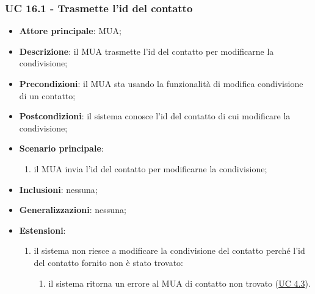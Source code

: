     \subsubsection{UC 16.1 - Trasmette l'id del contatto} \label{sec:UC16.1}
    \begin{itemize}
        \item \textbf{Attore principale}: MUA;
        \item \textbf{Descrizione}: il MUA trasmette l'id del contatto per modificarne la condivisione;
        \item \textbf{Precondizioni}: il MUA sta usando la funzionalità di modifica condivisione di un contatto;
        \item \textbf{Postcondizioni}: il sistema conosce l'id del contatto di cui modificare la condivisione;
        \item \textbf{Scenario principale}:
            \begin{enumerate}
                \item il MUA invia l'id del contatto per modificarne la condivisione;
            \end{enumerate}
        \item \textbf{Inclusioni}: nessuna;
        \item \textbf{Generalizzazioni}: nessuna;
        \item \textbf{Estensioni}:
            \begin{enumerate}[label=\alph*.]
                \item il sistema non riesce a modificare la condivisione del contatto perché l'id del contatto fornito non è stato trovato:
                \begin{enumerate}[label=\arabic*.]
                    \item il sistema ritorna un errore al MUA di contatto non trovato (\hyperref[sec:UC4.3]{UC 4.3}).
                \end{enumerate}
            \end{enumerate}
    \end{itemize}


